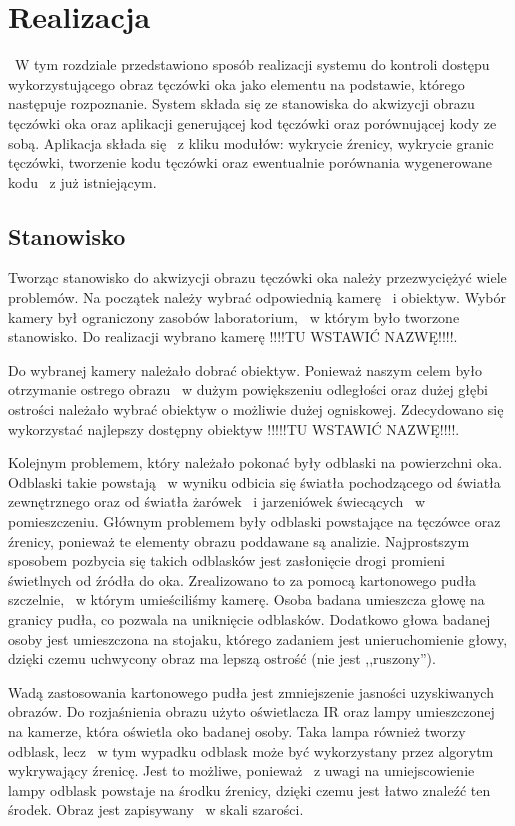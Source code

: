 \chapter{Realizacja}
\label{cha:realizacja}
~W tym rozdziale przedstawiono sposób realizacji systemu do kontroli dostępu wykorzystującego obraz tęczówki oka jako elementu na podstawie, którego następuje rozpoznanie. System składa się ze stanowiska do akwizycji obrazu tęczówki oka oraz aplikacji generującej kod tęczówki oraz porównującej kody ze sobą. Aplikacja składa się ~z kliku modułów: wykrycie źrenicy, wykrycie granic tęczówki, tworzenie kodu tęczówki oraz ewentualnie porównania wygenerowane kodu ~z już istniejącym.

\section{Stanowisko}
\label{sec:stanowisko}
Tworząc stanowisko do akwizycji obrazu tęczówki oka należy przezwyciężyć wiele problemów. Na początek należy wybrać odpowiednią kamerę ~i obiektyw. Wybór kamery był ograniczony zasobów laboratorium, ~w którym było tworzone stanowisko. Do realizacji wybrano kamerę !!!!TU WSTAWIĆ NAZWĘ!!!!.

Do wybranej kamery należało dobrać obiektyw. Ponieważ naszym celem było otrzymanie ostrego obrazu ~w dużym powiększeniu odległości oraz dużej głębi ostrości należało wybrać obiektyw o możliwie dużej ogniskowej. Zdecydowano się wykorzystać najlepszy dostępny obiektyw !!!!!TU WSTAWIĆ NAZWĘ!!!!.

Kolejnym problemem, który należało pokonać były odblaski na powierzchni oka. Odblaski takie powstają ~w wyniku odbicia się światła pochodzącego od światła zewnętrznego oraz od światła żarówek ~i jarzeniówek świecących ~w pomieszczeniu. Głównym problemem były odblaski powstające na tęczówce oraz źrenicy, ponieważ te elementy obrazu poddawane są analizie. Najprostszym sposobem pozbycia się takich odblasków jest zasłonięcie drogi promieni świetlnych od źródła do oka. Zrealizowano to za pomocą kartonowego pudła szczelnie, ~w którym umieściliśmy kamerę. Osoba badana umieszcza głowę na granicy pudła, co pozwala na uniknięcie odblasków. Dodatkowo głowa badanej osoby jest umieszczona na stojaku, którego zadaniem jest unieruchomienie głowy, dzięki czemu uchwycony obraz ma lepszą ostrość (nie jest ,,ruszony'').

Wadą zastosowania kartonowego pudła jest zmniejszenie jasności uzyskiwanych obrazów. Do rozjaśnienia obrazu użyto oświetlacza IR oraz lampy umieszczonej na kamerze, która oświetla oko badanej osoby. Taka lampa również tworzy odblask, lecz ~w tym wypadku odblask może być wykorzystany przez algorytm wykrywający źrenicę. Jest to możliwe, ponieważ ~z uwagi na umiejscowienie lampy odblask powstaje na środku źrenicy, dzięki czemu jest łatwo znaleźć ten środek. Obraz jest zapisywany ~w skali szarości.

